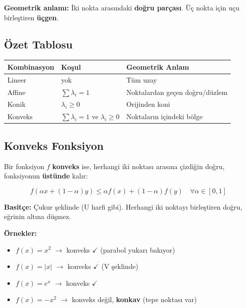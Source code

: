 \documentclass[12pt,a4paper]{article}
\theoremstyle{definition}
\theoremstyle{remark}
\begin{document}
\textbf{Geometrik anlam{\i}:} \.{I}ki nokta aras{\i}ndaki \textbf{do\u{g}ru par\c{c}as{\i}}. \"U\c{c} nokta i\c{c}in u\c{c}u birle\c{s}tiren \textbf{\"u\c{c}gen}.

\subsection{\"Ozet Tablosu}

\begin{table}[h]
\centering
\begin{tabular}{@{}lll@{}}
\toprule
\textbf{Kombinasyon} & \textbf{Ko\c{s}ul} & \textbf{Geometrik Anlam} \\
\midrule
Lineer   & yok                                     & T\"um uzay \\
Affine   & $\sum \lambda_i = 1$                    & Noktalardan ge\c{c}en do\u{g}ru/d\"uzlem \\
Konik    & $\lambda_i \geq 0$                      & Orijinden koni \\
Konveks  & $\sum \lambda_i = 1$ ve $\lambda_i \geq 0$ & Noktalar{\i}n i\c{c}indeki b\"olge \\
\bottomrule
\end{tabular}
\end{table}

\subsection{Konveks Fonksiyon}

Bir fonksiyon $f$ \textbf{konveks} ise, herhangi iki noktas{\i} aras{\i}na \c{c}izdi\u{g}in do\u{g}ru, fonksiyonun \textbf{\"ust\"unde} kal{\i}r:

\[
f(\alpha x + (1-\alpha)y) \leq \alpha f(x) + (1-\alpha)f(y) \quad \forall \alpha \in [0,1]
\]

\textbf{Basit\c{c}e:} \c{C}ukur \c{s}eklinde (U harfi gibi). Herhangi iki noktay{\i} birle\c{s}tiren do\u{g}ru, e\u{g}rinin alt{\i}na d\"u\c{s}mez.

\textbf{\"Ornekler:}
\begin{itemize}
    \item $f(x) = x^2$ $\to$ konveks $\checkmark$ (parabol yukar{\i} bak{\i}yor)
    \item $f(x) = |x|$ $\to$ konveks $\checkmark$ (V \c{s}eklinde)
    \item $f(x) = e^x$ $\to$ konveks $\checkmark$
    \item $f(x) = -x^2$ $\to$ konveks de\u{g}il, \textbf{konkav} (tepe noktas{\i} var)
\end{itemize}
\end{document}
